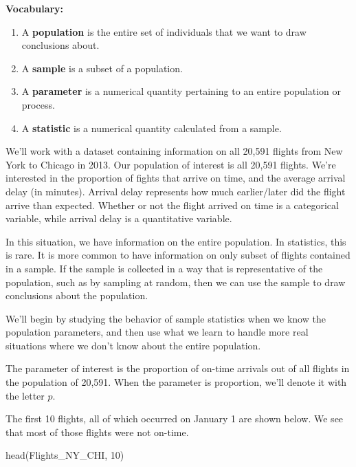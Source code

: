 \documentclass[
  letterpaper,
  DIV=11,
  numbers=noendperiod]{scrreprt}
\newenvironment{Shaded}{\begin{snugshade}}{\end{snugshade}}
\newcommand{\DecValTok}[1]{\textcolor[rgb]{0.68,0.00,0.00}{#1}}
\newcommand{\FunctionTok}[1]{\textcolor[rgb]{0.28,0.35,0.67}{#1}}
\newcommand{\NormalTok}[1]{\textcolor[rgb]{0.00,0.23,0.31}{#1}}
\providecommand{\tightlist}{%
  \setlength{\itemsep}{0pt}\setlength{\parskip}{0pt}}\usepackage{longtable,booktabs,array}
\begin{document}
\textbf{Vocabulary:}

\begin{enumerate}
\def\labelenumi{\arabic{enumi}.}
\tightlist
\item
  A \textbf{population} is the entire set of individuals that we want to
  draw conclusions about.
\item
  A \textbf{sample} is a subset of a population.\\
\item
  A \textbf{parameter} is a numerical quantity pertaining to an entire
  population or process.\\
\item
  A \textbf{statistic} is a numerical quantity calculated from a sample.
\end{enumerate}

We'll work with a dataset containing information on all 20,591 flights
from New York to Chicago in 2013. Our population of interest is all
20,591 flights. We're interested in the proportion of fights that arrive
on time, and the average arrival delay (in minutes). Arrival delay
represents how much earlier/later did the flight arrive than expected.
Whether or not the flight arrived on time is a categorical variable,
while arrival delay is a quantitative variable.

In this situation, we have information on the entire population. In
statistics, this is rare. It is more common to have information on only
subset of flights contained in a sample. If the sample is collected in a
way that is representative of the population, such as by sampling at
random, then we can use the sample to draw conclusions about the
population.

We'll begin by studying the behavior of sample statistics when we know
the population parameters, and then use what we learn to handle more
real situations where we don't know about the entire population.

The parameter of interest is the proportion of on-time arrivals out of
all flights in the population of 20,591. When the parameter is
proportion, we'll denote it with the letter \(p\).

The first 10 flights, all of which occurred on January 1 are shown
below. We see that most of those flights were not on-time.

\begin{Shaded}
\begin{Highlighting}[]
\FunctionTok{head}\NormalTok{(Flights\_NY\_CHI, }\DecValTok{10}\NormalTok{)}
\end{Highlighting}
\end{Shaded}
\end{document}
